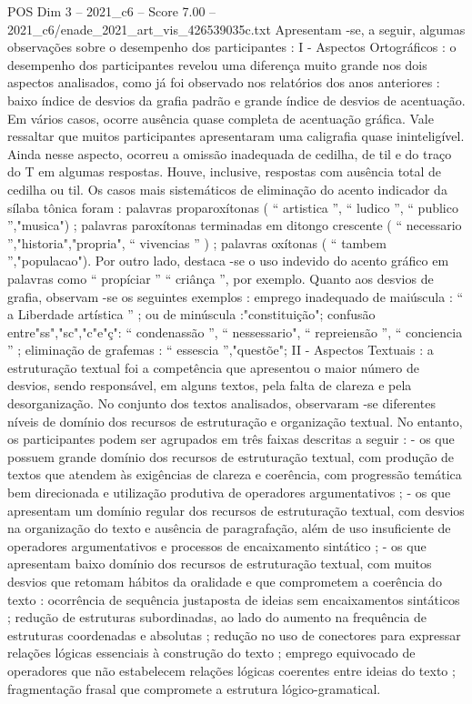 \begin{textsample}{POS Dim 3 – 2021\_c6 – Score 7.00 – 2021\_c6/enade\_2021\_art\_vis\_426539035c.txt}
Apresentam -se, a seguir, algumas observações sobre o desempenho dos participantes : I - Aspectos Ortográficos : o desempenho dos participantes revelou uma diferença muito grande nos dois aspectos analisados, como já foi observado nos relatórios dos anos anteriores : baixo índice de desvios da grafia padrão e grande índice de desvios de acentuação.
Em vários casos, ocorre ausência quase completa de acentuação gráfica.
Vale ressaltar que muitos participantes apresentaram uma caligrafia quase ininteligível.
Ainda nesse aspecto, ocorreu a omissão inadequada de cedilha, de til e do traço do T em algumas respostas.
Houve, inclusive, respostas com ausência total de cedilha ou til.
Os casos mais sistemáticos de eliminação do acento indicador da sílaba tônica foram : palavras proparoxítonas ( “ artistica ”, “ ludico ”, “ publico ”,"musica") ; palavras paroxítonas terminadas em ditongo crescente ( “ necessario ”,"historia","propria", “ vivencias ” ) ; palavras oxítonas ( “ tambem ”,"populacao").
Por outro lado, destaca -se o uso indevido do acento gráfico em palavras como “ propíciar ” “ criânça ”, por exemplo.
Quanto aos desvios de grafia, observam -se os seguintes exemplos : emprego inadequado de maiúscula : “ a Liberdade artística ” ; ou de minúscula :"constituição"; confusão entre"ss","sc","c"e"ç": “ condenassão ”, “ nessessario", “ repreiensão ”, “ conciencia ” ; eliminação de grafemas : “ essescia ”,"questõe"; II - Aspectos Textuais : a estruturação textual foi a competência que apresentou o maior número de desvios, sendo responsável, em alguns textos, pela falta de clareza e pela desorganização.
No conjunto dos textos analisados, observaram -se diferentes níveis de domínio dos recursos de estruturação e organização textual.
No entanto, os participantes podem ser agrupados em três faixas descritas a seguir : - os que possuem grande domínio dos recursos de estruturação textual, com produção de textos que atendem às exigências de clareza e coerência, com progressão temática bem direcionada e utilização produtiva de operadores argumentativos ; - os que apresentam um domínio regular dos recursos de estruturação textual, com desvios na organização do texto e ausência de paragrafação, além de uso insuficiente de operadores argumentativos e processos de encaixamento sintático ; - os que apresentam baixo domínio dos recursos de estruturação textual, com muitos desvios que retomam hábitos da oralidade e que comprometem a coerência do texto : ocorrência de sequência justaposta de ideias sem encaixamentos sintáticos ; redução de estruturas subordinadas, ao lado do aumento na frequência de estruturas coordenadas e absolutas ; redução no uso de conectores para expressar relações lógicas essenciais à construção do texto ; emprego equivocado de operadores que não estabelecem relações lógicas coerentes entre ideias do texto ; fragmentação frasal que compromete a estrutura lógico-gramatical.

\end{textsample}

